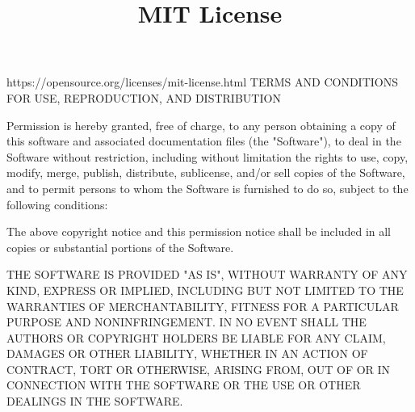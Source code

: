 \documentclass[a4paper, 12pt]{article}
\begin{document}
\title{MIT License}

\maketitle

https://opensource.org/licenses/mit-license.html TERMS AND CONDITIONS FOR USE, REPRODUCTION, AND DISTRIBUTION

Permission is hereby granted, free of charge, to any person obtaining a copy of this software and associated documentation files (the "Software"), to deal in the Software without restriction, including without limitation the rights to use, copy, modify, merge, publish, distribute, sublicense, and/or sell copies of the Software, and to permit persons to whom the Software is furnished to do so, subject to the following conditions:

The above copyright notice and this permission notice shall be included in all copies or substantial portions of the Software.

THE SOFTWARE IS PROVIDED "AS IS", WITHOUT WARRANTY OF ANY KIND, EXPRESS OR IMPLIED, INCLUDING BUT NOT LIMITED TO THE WARRANTIES OF MERCHANTABILITY, FITNESS FOR A PARTICULAR PURPOSE AND NONINFRINGEMENT. IN NO EVENT SHALL THE AUTHORS OR COPYRIGHT HOLDERS BE LIABLE FOR ANY CLAIM, DAMAGES OR OTHER LIABILITY, WHETHER IN AN ACTION OF CONTRACT, TORT OR OTHERWISE, ARISING FROM, OUT OF OR IN CONNECTION WITH THE SOFTWARE OR THE USE OR OTHER DEALINGS IN THE SOFTWARE.
\end{document}
